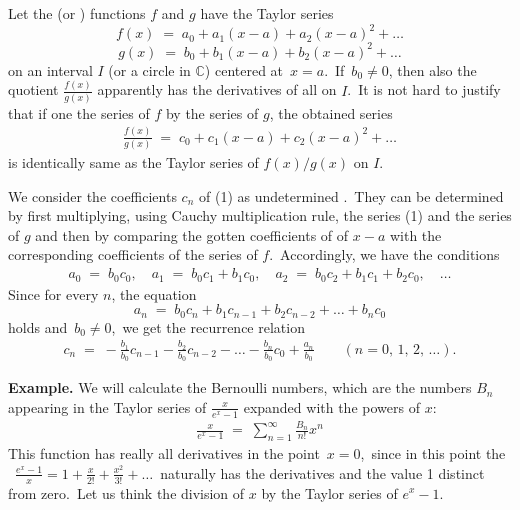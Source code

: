 \documentclass[12pt]{article}
\theoremstyle{definition}
\begin{document}
 
Let the  (or ) functions $f$ and $g$ have the Taylor series
$$f(x) \;=\; a_0+a_1(x-a)+a_2(x-a)^2+\ldots$$
$$g(x) \;=\; b_0+b_1(x-a)+b_2(x-a)^2+\ldots$$
on an interval $I$ (or a circle in $\mathbb{C}$) centered at\, $x = a$.\, If\, $b_0 \neq 0$, then also the quotient $\displaystyle\frac{f(x)}{g(x)}$ apparently has the derivatives of all  on $I$.\, It is not hard to justify that if one  the series of $f$ by the series of $g$, the obtained series
\begin{align}
\frac{f(x)}{g(x)} \;=\; c_0+c_1(x-a)+c_2(x-a)^2+\ldots
\end{align}
is identically same as the Taylor series of $f(x)/g(x)$ on $I$.

We consider the coefficients $c_n$ of (1) as undetermined .\, They can be determined by first multiplying, using Cauchy multiplication rule, the series (1) 
and the series of $g$ and then by comparing the gotten coefficients of  of $x\!-\!a$ with the corresponding coefficients of the series of $f$.\, Accordingly, we have the conditions
\begin{align}
a_0 \;=\; b_0c_0,\quad a_1 \;=\; b_0c_1+b_1c_0,\quad a_2 \;=\; b_0c_2+b_1c_1+b_2c_0,\quad \ldots
\end{align}
Since for every  $n$, the equation
$$a_n \;=\; b_0c_n+b_1c_{n-1}+b_2c_{n-2}+\ldots+b_nc_0$$
holds and\, $b_0 \neq 0$,\, we get the recurrence relation
\begin{align}
c_n \;=\; -\frac{b_1}{b_0}c_{n-1}-\frac{b_2}{b_0}c_{n-2}-\ldots-\frac{b_n}{b_0}c_0+\frac{a_n}{b_0}\quad\quad
(n = 0,\,1,\,2,\,\ldots).
\end{align}

\textbf{Example.} We will calculate the Bernoulli numbers, which are the numbers $B_n$ appearing in the Taylor series of $\displaystyle\frac{x}{e^x-1}$ expanded with the powers of $x$:
\begin{align}
\frac{x}{e^x-1} \;=\; \sum_{n=1}^\infty\frac{B_n}{n!}x^n
\end{align}
This function has really all derivatives in the point\, $x = 0$,\, since in this point the \, $\frac{e^x-1}{x} = 1+\frac{x}{2!}+\frac{x^2}{3!}+\ldots$\, naturally has the derivatives and the value 1 distinct from zero.\, Let us think the division of $x$ by the Taylor series of $e^x\!-\!1$.
 
\end{document}
